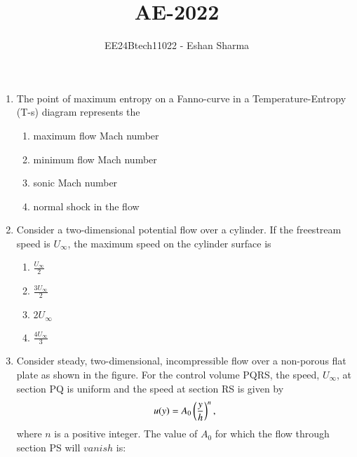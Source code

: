 \documentclass[journal,12pt,onecolumn]{IEEEtran}
\theoremstyle{remark}
\begin{document}

\vspace{3cm}

\title{AE-2022}
\author{EE24Btech11022 - Eshan Sharma}
\maketitle

\renewcommand{\thefigure}{\theenumi}
\renewcommand{\thetable}{\theenumi}



\begin{enumerate}
\item The point of maximum entropy on a Fanno-curve in a Temperature-Entropy (T-s) diagram represents the
\begin{enumerate}
	\item maximum flow Mach number
	\item minimum flow Mach number
	\item sonic Mach number
	\item normal shock in the flow
\end{enumerate}

\item Consider a two-dimensional potential flow over a cylinder. If the freestream speed is $U_{\infty}$, the maximum speed on the cylinder surface is
\begin{enumerate}
	\item $\frac{U_{\infty}}{2}$
	\item $\frac{3 U_{\infty}}{2}$
	\item $2 U_{\infty}$
	\item $\frac{4 U_{\infty}}{3}$
\end{enumerate}

\item Consider steady, two-dimensional, incompressible flow over a non-porous flat plate as shown in the figure. For the control volume PQRS, the speed, $U_{\infty}$, at section PQ is uniform and the speed at section RS is given by 
\[
u(y) = A_0 \left(\frac{y}{h}\right)^n,
\]
where $n$ is a positive integer. The value of $A_0$ for which the flow through section PS will $vanish$ is:


\end{enumerate}
\end{document}
